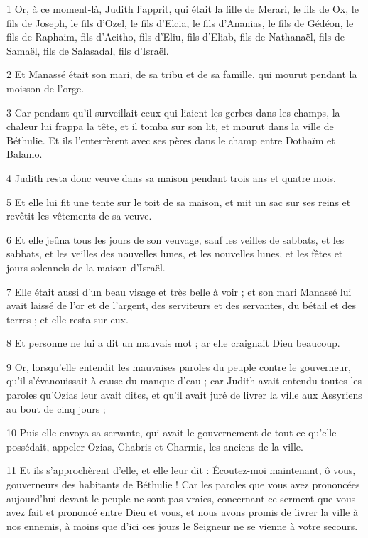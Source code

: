 \par 1 Or, à ce moment-là, Judith l'apprit, qui était la fille de Merari, le fils de Ox, le fils de Joseph, le fils d'Ozel, le fils d'Elcia, le fils d'Ananias, le fils de Gédéon, le fils de Raphaim, fils d'Acitho, fils d'Eliu, fils d'Eliab, fils de Nathanaël, fils de Samaël, fils de Salasadal, fils d'Israël.
\par 2 Et Manassé était son mari, de sa tribu et de sa famille, qui mourut pendant la moisson de l'orge.
\par 3 Car pendant qu'il surveillait ceux qui liaient les gerbes dans les champs, la chaleur lui frappa la tête, et il tomba sur son lit, et mourut dans la ville de Béthulie. Et ils l'enterrèrent avec ses pères dans le champ entre Dothaïm et Balamo.
\par 4 Judith resta donc veuve dans sa maison pendant trois ans et quatre mois.
\par 5 Et elle lui fit une tente sur le toit de sa maison, et mit un sac sur ses reins et revêtit les vêtements de sa veuve.
\par 6 Et elle jeûna tous les jours de son veuvage, sauf les veilles de sabbats, et les sabbats, et les veilles des nouvelles lunes, et les nouvelles lunes, et les fêtes et jours solennels de la maison d'Israël.
\par 7 Elle était aussi d'un beau visage et très belle à voir ; et son mari Manassé lui avait laissé de l'or et de l'argent, des serviteurs et des servantes, du bétail et des terres ; et elle resta sur eux.
\par 8 Et personne ne lui a dit un mauvais mot ; ar elle craignait Dieu beaucoup.
\par 9 Or, lorsqu'elle entendit les mauvaises paroles du peuple contre le gouverneur, qu'il s'évanouissait à cause du manque d'eau ; car Judith avait entendu toutes les paroles qu'Ozias leur avait dites, et qu'il avait juré de livrer la ville aux Assyriens au bout de cinq jours ;
\par 10 Puis elle envoya sa servante, qui avait le gouvernement de tout ce qu'elle possédait, appeler Ozias, Chabris et Charmis, les anciens de la ville.
\par 11 Et ils s'approchèrent d'elle, et elle leur dit : Écoutez-moi maintenant, ô vous, gouverneurs des habitants de Béthulie ! Car les paroles que vous avez prononcées aujourd'hui devant le peuple ne sont pas vraies, concernant ce serment que vous avez fait et prononcé entre Dieu et vous, et nous avons promis de livrer la ville à nos ennemis, à moins que d'ici ces jours le Seigneur ne se vienne à votre secours.
